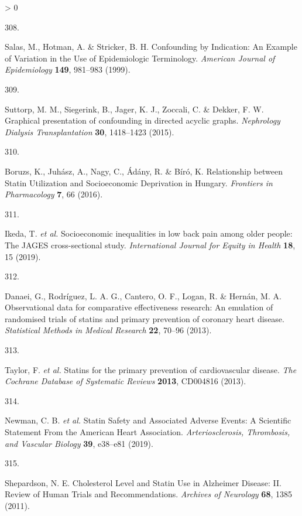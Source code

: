 \documentclass[a4paper, twoside]{templates/ociamthesis}
\newlength{\cslhangindent}
\newlength{\csllabelwidth}
\newenvironment{CSLReferences}[3] %
 {%
  \setlength{\parindent}{0pt}
  \ifodd #1 \everypar{\setlength{\hangindent}{\cslhangindent}}\ignorespaces\fi
  \ifnum #2 > 0
  \setlength{\parskip}{#2\baselineskip}
  \fi
 }%
 {}
\newcommand{\CSLLeftMargin}[1]{\parbox[t]{\maxof{\widthof{#1}}{\csllabelwidth}}{#1}}
\newcommand{\CSLRightInline}[1]{\parbox[t]{\linewidth - \csllabelwidth}{#1}}
\begin{document}
\begin{CSLReferences}{0}{0}
\leavevmode\hypertarget{ref-salas1999}{}%
\CSLLeftMargin{308. }
\CSLRightInline{Salas, M., Hotman, A. \& Stricker, B. H. Confounding by {Indication}: An {Example} of {Variation} in the {Use} of {Epidemiologic Terminology}. \emph{American Journal of Epidemiology} \textbf{149}, 981--983 (1999).}

\leavevmode\hypertarget{ref-suttorp2015}{}%
\CSLLeftMargin{309. }
\CSLRightInline{Suttorp, M. M., Siegerink, B., Jager, K. J., Zoccali, C. \& Dekker, F. W. Graphical presentation of confounding in directed acyclic graphs. \emph{Nephrology Dialysis Transplantation} \textbf{30}, 1418--1423 (2015).}

\leavevmode\hypertarget{ref-boruzs2016}{}%
\CSLLeftMargin{310. }
\CSLRightInline{Boruzs, K., Juhász, A., Nagy, C., Ádány, R. \& Bíró, K. Relationship between {Statin Utilization} and {Socioeconomic Deprivation} in {Hungary}. \emph{Frontiers in Pharmacology} \textbf{7}, 66 (2016).}

\leavevmode\hypertarget{ref-ikeda2019}{}%
\CSLLeftMargin{311. }
\CSLRightInline{Ikeda, T. \emph{et al.} Socioeconomic inequalities in low back pain among older people: The {JAGES} cross-sectional study. \emph{International Journal for Equity in Health} \textbf{18}, 15 (2019).}

\leavevmode\hypertarget{ref-danaei2013}{}%
\CSLLeftMargin{312. }
\CSLRightInline{Danaei, G., Rodríguez, L. A. G., Cantero, O. F., Logan, R. \& Hernán, M. A. Observational data for comparative effectiveness research: An emulation of randomised trials of statins and primary prevention of coronary heart disease. \emph{Statistical Methods in Medical Research} \textbf{22}, 70--96 (2013).}

\leavevmode\hypertarget{ref-taylor2013}{}%
\CSLLeftMargin{313. }
\CSLRightInline{Taylor, F. \emph{et al.} Statins for the primary prevention of cardiovascular disease. \emph{The Cochrane Database of Systematic Reviews} \textbf{2013}, CD004816 (2013).}

\leavevmode\hypertarget{ref-newman2019}{}%
\CSLLeftMargin{314. }
\CSLRightInline{Newman, C. B. \emph{et al.} Statin {Safety} and {Associated Adverse Events}: A {Scientific Statement From} the {American Heart Association}. \emph{Arteriosclerosis, Thrombosis, and Vascular Biology} \textbf{39}, e38--e81 (2019).}

\leavevmode\hypertarget{ref-shepardson2011}{}%
\CSLLeftMargin{315. }
\CSLRightInline{Shepardson, N. E. Cholesterol {Level} and {Statin Use} in {Alzheimer Disease}: {II}. {Review} of {Human Trials} and {Recommendations}. \emph{Archives of Neurology} \textbf{68}, 1385 (2011).}


\end{CSLReferences}
\end{document}
